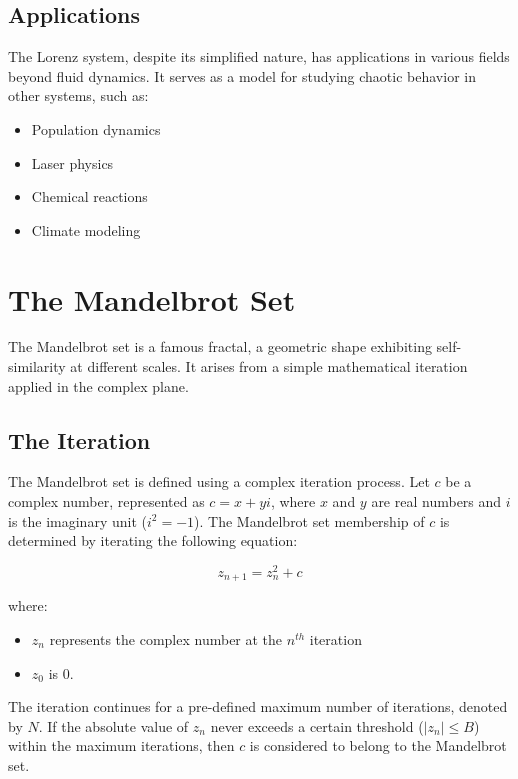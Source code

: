 \documentclass[12pt,a4paper]{article}
\begin{document}
\subsection{Applications}

The Lorenz system, despite its simplified nature, has applications in various fields beyond fluid dynamics. It serves as a model for studying chaotic behavior in other systems, such as:

\begin{itemize}
    \item Population dynamics
    \item Laser physics
    \item Chemical reactions
    \item Climate modeling
\end{itemize}


\section{The Mandelbrot Set}

The Mandelbrot set is a famous fractal, a geometric shape exhibiting self-similarity at different scales. It arises from a simple mathematical iteration applied in the complex plane. 

\subsection{The Iteration}

The Mandelbrot set is defined using a complex iteration process. Let $c$ be a complex number, represented as $c = x + yi$, where $x$ and $y$ are real numbers and $i$ is the imaginary unit ($i^2 = -1$). The Mandelbrot set membership of $c$ is determined by iterating the following equation:

\begin{equation}
z_{n+1} = z_n^2 + c
\end{equation}

where:
\begin{itemize}
    \item $z_n$ represents the complex number at the $n^{th}$ iteration
    \item $z_0$ is  $0$.
\end{itemize}


The iteration continues for a pre-defined maximum number of iterations, denoted by $N$. If the absolute value of $z_n$ never exceeds a certain threshold ($|z_n| \leq B$) within the maximum iterations, then $c$ is considered to belong to the Mandelbrot set.
\end{document}
